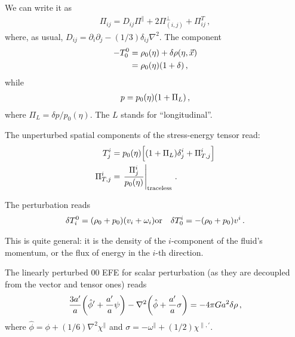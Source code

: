\documentclass[main.tex]{subfiles}
\begin{document}
We can write it as 
%
\begin{align}
\Pi_{ij} = D_{ij} \Pi^{\parallel} + 2\Pi^{\perp}_{(i, j)} + \Pi^{T}_{ij}
\,,
\end{align}
%
where, as usual, \(D_{ij} = \partial_{i} \partial_{j} - (1/3) \delta_{ij} \nabla^2\). 
The component 
%
\begin{align}
- T^{0}_{0} &= \rho_{0} (\eta ) + \delta \rho (\eta , \vec{x})  \\
&= \rho_0 (\eta ) \qty(1 + \delta ) 
\,,
\end{align}
%
while 
%
\begin{align}
p = p_0 (\eta ) \qty(1 + \Pi _L) 
\,,
\end{align}
%
where \(\Pi _L = \delta p / p_0 (\eta )\). The \(L\) stands for ``longitudinal''. 

The unperturbed spatial components of the stress-energy tensor read:
%
\begin{align}
T^{i}_{j} &= p_0 (\eta ) \qty[ \qty(1 + \Pi _L) \delta^{i}_{j} + \Pi_{T, j}^{i}]  \\
\Pi_{T, j}^{i} &= \eval{\frac{\Pi^{i}_{j}}{p_0 (\eta )}}_{\text{traceless}}
\,.
\end{align}

The perturbation reads 
%
\begin{align}
\delta T^{0}_{i} = \qty(\rho_0 + p_0 ) \qty(v_i + \omega _i )
&
\text{or}
&
\delta T^{i}_{0} = - (\rho_0 + p_0 ) v^{i}
\,.
\end{align}

This is quite general: it is the density of the \(i\)-component of the fluid's momentum, or the flux of energy in the \(i\)-th direction.

The linearly perturbed \(00\) EFE for scalar perturbation (as they are decoupled from the vector and tensor ones) reads 
%
\begin{align}
\frac{3 a'}{a} \qty(\hat{\phi}' + \frac{a'}{a} \psi ) - \nabla^2 \qty(\hat{\phi} + \frac{a'}{a} \sigma ) = - 4 \pi G a^2 \delta \rho 
\,,
\end{align}
%
where \(\hat{\phi} = \phi + (1/6) \nabla^2 \chi^{\parallel}\) and \(\sigma = - \omega^{\parallel} + (1/2) \chi^{\parallel, \prime}\). 
\end{document}
